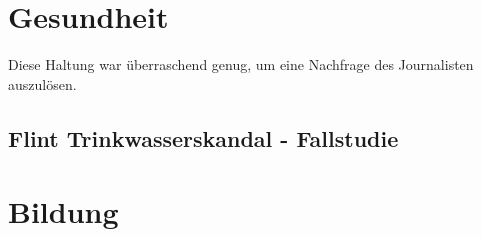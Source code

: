 \section{Gesundheit}

Diese Haltung war überraschend genug, um eine Nachfrage des Journalisten
auszulösen.

\subsection{Flint Trinkwasserskandal - Fallstudie}

\section{Bildung}

